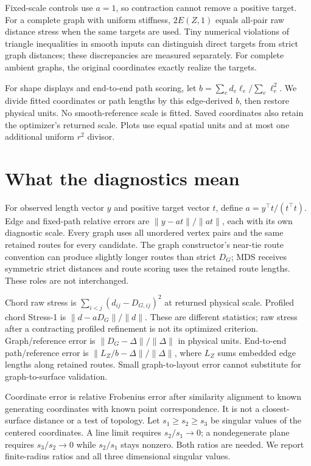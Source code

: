 \documentclass[11pt,letterpaper,landscape]{article}
\begin{document}
Fixed-scale controls use $a=1$, so contraction cannot remove a positive target.
For a complete graph with uniform stiffness, $2E(Z,1)$ equals all-pair raw
distance stress when the same targets are used. Tiny numerical violations of
triangle inequalities in smooth inputs can distinguish direct targets from
strict graph distances; these discrepancies are measured separately.
For complete ambient graphs, the original coordinates exactly realize the targets.

For shape displays and end-to-end path scoring, let
$b=\sum_e d_e\ell_e/\sum_e\ell_e^2$. We divide fitted coordinates or path
lengths by this edge-derived $b$, then restore physical units. No smooth-reference
scale is fitted. Saved coordinates also retain the optimizer's returned scale.
Plots use equal spatial units and at most one additional uniform $r^2$ divisor.

\clearpage
\section*{What the diagnostics mean}
For observed length vector $y$ and positive target vector $t$, define
$a=y^\top t/(t^\top t)$. Edge and fixed-path relative errors are
$\|y-at\|/\|at\|$, each with its own diagnostic scale. Every graph uses all
unordered vertex pairs and the same retained routes for every candidate.
The graph constructor's near-tie route convention can produce slightly longer
routes than strict $D_G$; MDS receives symmetric strict distances and route
scoring uses the retained route lengths. These roles are not interchanged.

Chord raw stress is $\sum_{i<j}(d_{ij}-D_{G,ij})^2$ at returned physical scale.
Profiled chord Stress-1 is $\|d-aD_G\|/\|d\|$. These are different statistics;
raw stress after a contracting profiled refinement is not its optimized criterion.
Graph/reference error is $\|D_G-\Delta\|/\|\Delta\|$ in physical units.
End-to-end path/reference error is $\|L_Z/b-\Delta\|/\|\Delta\|$, where
$L_Z$ sums embedded edge lengths along retained routes. Small graph-to-layout
error cannot substitute for graph-to-surface validation.

Coordinate error is relative Frobenius error after similarity alignment to
known generating coordinates with known point correspondence. It is not a
closest-surface distance or a test of topology. Let
$s_1\geq s_2\geq s_3$ be singular values of the centered coordinates.
A line limit requires $s_2/s_1\to0$; a nondegenerate plane requires
$s_3/s_2\to0$ while $s_2/s_1$ stays nonzero. Both ratios are needed.
We report finite-radius ratios and all three dimensional singular values.
\end{document}
